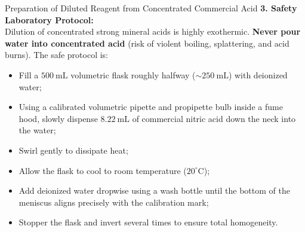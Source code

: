 \begin{workedexample}{Preparation of Diluted Reagent from Concentrated Commercial Acid}
\textbf{3. Safety Laboratory Protocol:}\\
Dilution of concentrated strong mineral acids is highly exothermic. \textbf{Never pour water into concentrated acid} (risk of violent boiling, splattering, and acid burns).
The safe protocol is:
\begin{itemize}[leftmargin=1.5em,itemsep=2pt]
  \item Fill a $500\ \mathrm{mL}$ volumetric flask roughly halfway ($\sim 250\ \mathrm{mL}$) with deionized water;
  \item Using a calibrated volumetric pipette and propipette bulb inside a fume hood, slowly dispense $8.22\ \mathrm{mL}$ of commercial nitric acid down the neck into the water;
  \item Swirl gently to dissipate heat;
  \item Allow the flask to cool to room temperature ($20^\circ\mathrm{C}$);
  \item Add deionized water dropwise using a wash bottle until the bottom of the meniscus aligns precisely with the calibration mark;
  \item Stopper the flask and invert several times to ensure total homogeneity.
\end{itemize}
\end{workedexample}

